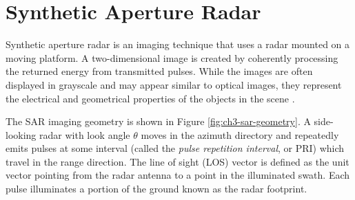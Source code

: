 \section{Synthetic Aperture Radar}
\label{sec:ch3-sar}


Synthetic aperture radar is an imaging technique that uses a radar mounted on a moving platform. A two-dimensional image is created by coherently processing the returned energy from transmitted pulses. While the images are often displayed in grayscale and may appear similar to optical images, they represent the electrical and geometrical properties of the objects in the scene \cite{Simons2007InterferometricSyntheticAperture}.


The SAR imaging geometry is shown in Figure \ref{fig:ch3-sar-geometry}. A side-looking radar with look angle $\theta$ moves in the azimuth directory and repeatedly emits pulses at some interval (called the \emph{pulse repetition interval}, or PRI) which travel in the range direction.
The line of sight (LOS) vector is defined as the unit vector pointing from the radar antenna to a point in the illuminated swath.
Each pulse illuminates a portion of the ground known as the radar footprint.


